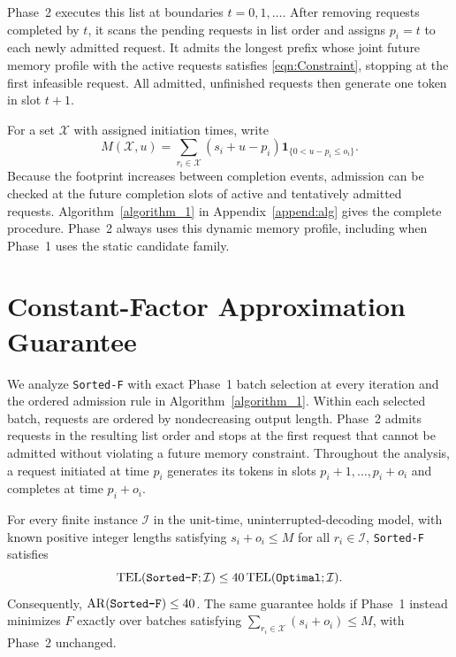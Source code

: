 \documentclass[nonblindrev]{informs3_hide}
\newcommand{\sortF}{\texttt{Sorted-F}}
\newcommand{\opt}{\texttt{Optimal}}
\begin{document}
Phase~2 executes this list at boundaries $t=0,1,\ldots$. After removing requests completed by $t$, it scans the pending requests in list order and assigns $p_i=t$ to each newly admitted request. It admits the longest prefix whose joint future memory profile with the active requests satisfies \eqref{eqn:Constraint}, stopping at the first infeasible request. All admitted, unfinished requests then generate one token in slot $t+1$.

For a set $\mathcal X$ with assigned initiation times, write
\begin{equation}
\label{eq:sf_memory_profile}
M(\mathcal X,u)=\sum_{r_i\in\mathcal X}(s_i+u-p_i)
\mathbf 1_{\{0<u-p_i\le o_i\}}.
\end{equation}
Because the footprint increases between completion events, admission can be checked at the future completion slots of active and tentatively admitted requests. Algorithm~\ref{algorithm_1} in Appendix~\ref{append:alg} gives the complete procedure. Phase~2 always uses this dynamic memory profile, including when Phase~1 uses the static candidate family.


\section{Constant-Factor Approximation Guarantee}
\label{sec:proof}

We analyze \sortF{} with exact Phase~1 batch selection at every iteration and the ordered
admission rule in Algorithm~\ref{algorithm_1}. Within each selected batch,
requests are ordered by nondecreasing output length. Phase~2 admits requests
in the resulting list order and stops at the first request that cannot be
admitted without violating a future memory constraint. Throughout the
analysis, a request initiated at time $p_i$ generates its tokens in slots
$p_i+1,\ldots,p_i+o_i$ and completes at time $p_i+o_i$.

\begin{theorem}
\label{thm:cr}
For every finite instance $\mathcal I$ in the unit-time, uninterrupted-decoding
model, with known positive integer lengths satisfying $s_i+o_i\le M$ for all
$r_i\in\mathcal I$,
\sortF{} satisfies
\[
    \mathrm{TEL}(\textup{\sortF};\mathcal I)
    \le 40\,\mathrm{TEL}(\textup{\opt};\mathcal I).
\]
Consequently, $\mathrm{AR}(\textup{\sortF})\le40$.
The same guarantee holds if Phase~1 instead minimizes $F$ exactly over
batches satisfying $\sum_{r_i\in\mathcal X}(s_i+o_i)\le M$, with Phase~2
unchanged.
\end{theorem}
\end{document}
